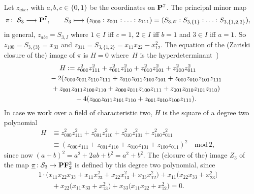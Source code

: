 \documentclass[pdftex]{sigma}
\newcommand{\FF}{{\bf F}}
\newcommand{\PP}{{\bf P}}
\newcommand{\cS}{{\cal S}}
\numberwithin{equation}{section}
\begin{document}
\begin{Example}[the case $n=3$] \label{n3}
Let $z_{abc}$, with $a,b,c\in\{0,1\}$ be the coordinates on $\PP^7$. The principal minor map
\begin{gather*}
\pi\colon \ \cS_3 \longrightarrow \PP^7,\qquad S_3 \longmapsto (z_{000}:z_{001}:\ldots:z_{111})= (S_{3,\varnothing}:S_{3,\{1\}}:\ldots:S_{3,\{1,2,3\}}),
\end{gather*}
in general, $z_{abc}=S_{3,I}$ where $1\in I$ iff $c=1$, $2\in I$ iff $b=1$ and $3\in I$ iff $a=1$. So $z_{100}=S_{3,\{3\}}=x_{33}$ and $z_{011}=S_{3,\{1,2\}}=x_{11}x_{22}-x_{12}^2$. The equation of the (Zariski closure of the) image of $\pi$ is $H=0$ where~$H$ is the hyperdeterminant~\cite{HS,Oeding})
\begin{gather*}
H :=z_{000}^2z_{111}^2+z_{001}^2z_{110}^2+z_{010}^2z_{101}^2+z_{100}^2z_{011}^2\\
\hphantom{H :=}{} -2(z_{000}z_{001}z_{110}z_{111} + z_{010}z_{011}z_{100}z_{101} + z_{000}z_{010}z_{101}z_{111} \\
\hphantom{H :=}{} +z_{001}z_{011}z_{100}z_{110} + z_{000}z_{011}z_{100}z_{111} + z_{001}z_{010}z_{101}z_{110})\\
\hphantom{H :=}{} +4(z_{000}z_{011}z_{101}z_{110}+z_{001}z_{010}z_{100}z_{111}).
\end{gather*}
In case we work over a field of characteristic two, $H$ is the square of a degree two polynomial
\begin{align*}
H & \equiv z_{000}^2z_{111}^2+z_{001}^2z_{110}^2+z_{010}^2z_{101}^2+z_{100}^2z_{011}^2\\
& \equiv (z_{000}z_{111}+z_{001}z_{110}+z_{010}z_{101}+z_{100}z_{011})^2 \quad\text{mod}\, 2,
\end{align*}
since now $(a+b)^2=a^2+2ab+b^2=a^2+b^2$. The (closure of the) image $Z_3$ of the map $\underline{\pi}\colon \cS_3\rightarrow\PP\FF_2^3$ is defined by this degree two polynomial, since
\begin{gather*}
1\cdot\big(x_{11}x_{22}x_{33}+x_{11}x_{23}^2 +x_{22}x_{13}^2 + x_{33}x_{12}^2\big)+ x_{11}\big(x_{22}x_{33}+x_{23}^2\big)\\
 \qquad{} + x_{22}\big(x_{11}x_{33}+x_{13}^2\big)+ x_{33}\big(x_{11}x_{22}+x_{12}^2\big)=0.
\end{gather*}
\end{Example}
\end{document}
